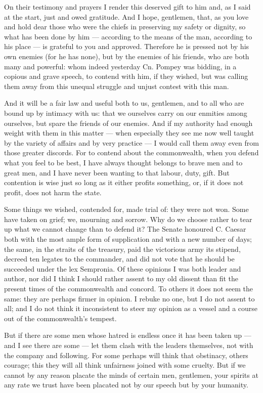  On their testimony and prayers I render this deserved gift to him and, as I said at the start, just and owed gratitude. And I hope, gentlemen, that, as you love and hold dear those who were the chiefs in preserving my safety or dignity, so what has been done by him --- according to the means of the man, according to his place --- is grateful to you and approved. Therefore he is pressed not by his own enemies (for he has none), but by the enemies of his friends, who are both many and powerful: whom indeed yesterday Cn. Pompey was bidding, in a copious and grave speech, to contend with him, if they wished, but was calling them away from this unequal struggle and unjust contest with this man.

 And it will be a fair law and useful both to us, gentlemen, and to all who are bound up by intimacy with us: that we ourselves carry on our enmities among ourselves, but spare the friends of our enemies. And if my authority had enough weight with them in this matter --- when especially they see me now well taught by the variety of affairs and by very practice --- I would call them away even from those greater discords. For to contend about the commonwealth, when you defend what you feel to be best, I have always thought belongs to brave men and to great men, and I have never been wanting to that labour, duty, gift. But contention is wise just so long as it either profits something, or, if it does not profit, does not harm the state.

 Some things we wished, contended for, made trial of: they were not won. Some have taken on grief; we, mourning and sorrow. Why do we choose rather to tear up what we cannot change than to defend it? The Senate honoured C. Caesar both with the most ample form of supplication and with a new number of days; the same, in the straits of the treasury, paid the victorious army its stipend, decreed ten legates to the commander, and did not vote that he should be succeeded under the lex Sempronia. Of these opinions I was both leader and author, nor did I think I should rather assent to my old dissent than fit the present times of the commonwealth and concord. To others it does not seem the same: they are perhaps firmer in opinion. I rebuke no one, but I do not assent to all; and I do not think it inconsistent to steer my opinion as a vessel and a course out of the commonwealth's tempest.

 But if there are some men whose hatred is endless once it has been taken up --- and I see there are some --- let them clash with the leaders themselves, not with the company and following. For some perhaps will think that obstinacy, others courage; this they will all think unfairness joined with some cruelty. But if we cannot by any reason placate the minds of certain men, gentlemen, your spirits at any rate we trust have been placated not by our speech but by your humanity.

